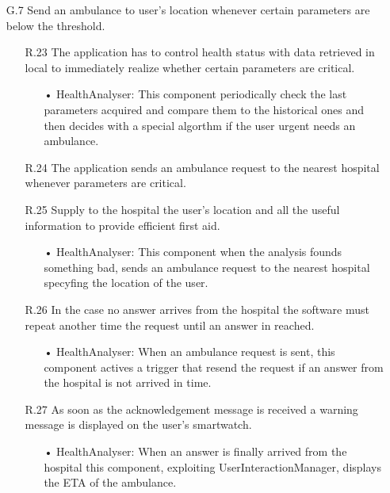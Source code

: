 \begin{enumerate}
\item [G.7] Send an ambulance to user's location whenever certain parameters are below the threshold.
	\begin{enumerate}
	\item [R.23] The application has to control health status with data retrieved in local to immediately realize whether certain parameters are critical.
		\begin{enumerate}
		\item[•] HealthAnalyser: This component periodically check the last parameters acquired and compare them to the historical ones and then decides with a special algorthm if the user urgent needs an ambulance.
		\end{enumerate}	
	\item [R.24] The application sends an ambulance request to the nearest hospital whenever parameters are critical.
	\item [R.25] Supply to the hospital the user's location and all the useful information to provide efficient first aid.
		\begin{enumerate}
		\item[•] HealthAnalyser: This component when the analysis founds something bad, sends an ambulance request to the nearest hospital specyfing the location of the user.
		\end{enumerate}	
	\item [R.26] In the case no answer arrives from the hospital the software must repeat another time the request until an answer in reached.
		\begin{enumerate}
		\item[•] HealthAnalyser: When an ambulance request is sent, this component actives a trigger that resend the request if an answer from the hospital is not arrived in time.
		\end{enumerate}	
	\item [R.27] As soon as the acknowledgement message is received a warning message is displayed on the user's smartwatch.
		\begin{enumerate}
		\item[•] HealthAnalyser: When an answer is finally arrived from the hospital this component, exploiting UserInteractionManager, displays the ETA of the ambulance.
		\end{enumerate}	
	\end{enumerate}
	

\end{enumerate}
